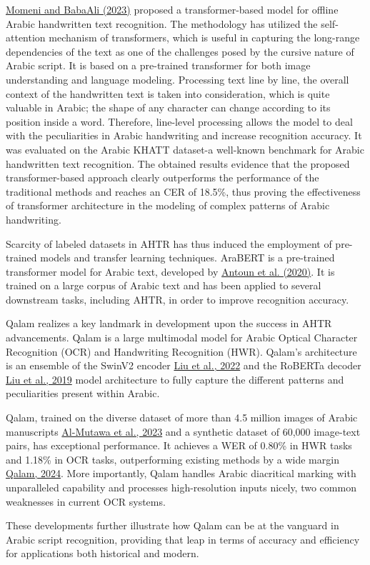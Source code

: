 \hyperref[Momeni2023]{Momeni and BabaAli (2023)} proposed a transformer-based model for offline Arabic handwritten text recognition. The methodology has utilized the self-attention mechanism of transformers, which is useful in capturing the long-range dependencies of the text as one of the challenges posed by the cursive nature of Arabic script.
It is based on a pre-trained transformer for both image understanding and language modeling. Processing text line by line, the overall context of the handwritten text is taken into consideration, which is quite valuable in Arabic; the shape of any character can change according to its position inside a word. Therefore, line-level processing allows the model to deal with the peculiarities in Arabic handwriting and increase recognition accuracy.
It was evaluated on the Arabic KHATT dataset-a well-known benchmark for Arabic handwritten text recognition. The obtained results evidence that the proposed transformer-based approach clearly outperforms the performance of the traditional methods and reaches an CER of 18.5\%, thus proving the effectiveness of transformer architecture in the modeling of complex patterns of Arabic handwriting.

Scarcity of labeled datasets in AHTR has thus induced the employment of pre-trained models and transfer learning techniques. AraBERT is a pre-trained transformer model for Arabic text, developed by \hyperref[Antoun2020]{Antoun et al. (2020)}. It is trained on a large corpus of Arabic text and has been applied to several downstream tasks, including AHTR, in order to improve recognition accuracy.

Qalam realizes a key landmark in development upon the success in AHTR advancements. Qalam is a large multimodal model for Arabic Optical Character Recognition (OCR) and Handwriting Recognition (HWR). Qalam's architecture is an ensemble of the SwinV2 encoder \hyperref[Liu2022]{Liu et al., 2022} and the RoBERTa decoder \hyperref[Liu2019]{Liu et al., 2019} model architecture to fully capture the different patterns and peculiarities present within Arabic.

Qalam, trained on the diverse dataset of more than 4.5 million images of Arabic manuscripts \hyperref[Manuscripts2023]{Al-Mutawa et al., 2023} and a synthetic dataset of 60,000 image-text pairs, has exceptional performance. It achieves a WER of 0.80\% in HWR tasks and 1.18\% in OCR tasks, outperforming existing methods by a wide margin \hyperref[Qalam2024]{Qalam, 2024}. More importantly, Qalam handles Arabic diacritical marking with unparalleled capability and processes high-resolution inputs nicely, two common weaknesses in current OCR systems.

These developments further illustrate how Qalam can be at the vanguard in Arabic script recognition, providing that leap in terms of accuracy and efficiency for applications both historical and modern.